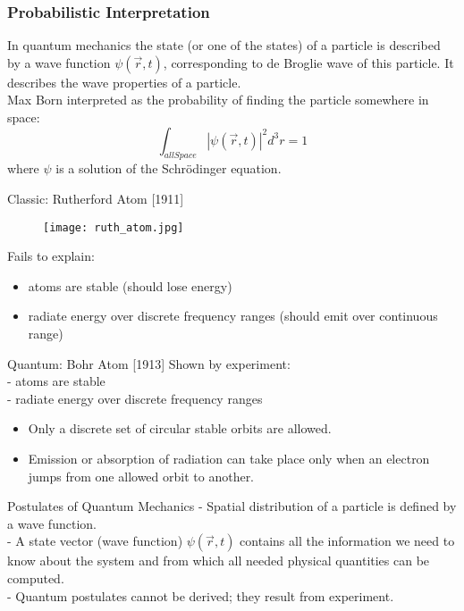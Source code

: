 \documentclass[10pt]{beamer}
\begin{document}
\begin{frame}
\frametitle{Probabilistic Interpretation}
In quantum mechanics the state (or one of the states) of a particle is described by a wave function $\psi(\vec r, t)$, corresponding to de Broglie wave of this particle.
It describes the wave properties of a particle.\\
\pause Max Born interpreted as the probability of finding the particle somewhere in space:
$$\int_{allSpace} |\psi(\vec r, t)|^2 d^3 r = 1$$
where $\psi$ is a solution of the Schrödinger equation.
\end{frame}

\begin{frame}{Classic: Rutherford Atom [1911]}
\begin{figure}
\texttt{[image: ruth\_atom.jpg]}
\end{figure}
Fails to explain:
\begin{itemize}
    \item atoms are stable (should lose energy)
    \item radiate energy over discrete frequency ranges (should emit over continuous range)
\end{itemize}
\end{frame}

\begin{frame}{Quantum: Bohr Atom [1913]}
Shown by experiment:\\
\hspace{1cm}  - atoms are stable\\
\hspace{1cm}  - radiate energy over discrete frequency ranges
\begin{itemize}
\item Only a \alert{discrete} set of circular stable orbits are allowed.
\item Emission or absorption of radiation can take place only when an electron jumps from one allowed orbit to another.
\end{itemize}
\end{frame}

\begin{frame}{Postulates of Quantum Mechanics}
- Spatial distribution of a particle is defined by a wave function.\\
- A state vector (wave function) $\psi (\vec r, t)$ contains all the information we need to know about the system and from which all needed physical quantities can be computed.\\
- Quantum postulates cannot be derived; they result from experiment.\\
\end{frame}
\end{document}
